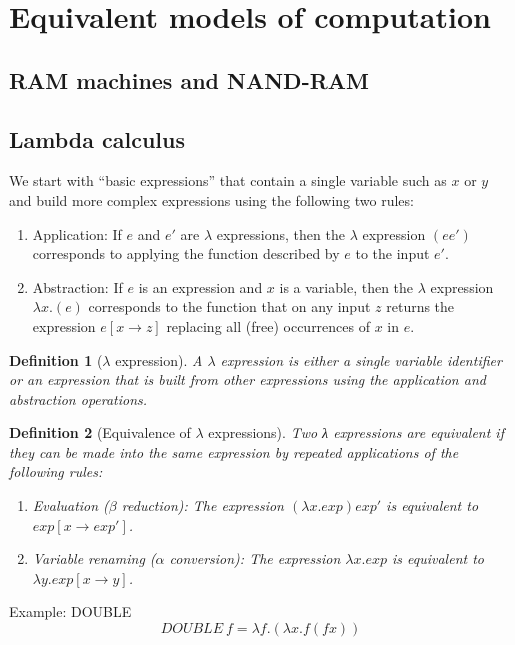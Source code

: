 \documentclass[aps,pra,onecolumn,notitlepage,superscriptaddress]{revtex4-1}
\newtheorem{defi}{Definition}
\begin{document}
    \section{Equivalent models of computation}
    \subsection{RAM machines and NAND-RAM}
    \subsection{Lambda calculus}
    We start with ``basic expressions'' that contain a single variable such as $x$ or $y$ and build more complex expressions using the following two rules:
    \begin{enumerate}
        \item Application: If $e$ and $e'$ are $\lambda$ expressions, then the $\lambda$ expression $(ee')$ corresponds to applying the function described by $e$ to the input $e'$.
        \item Abstraction: If $e$ is an expression and $x$ is a variable, then the $\lambda$ expression $\lambda x . (e)$ corresponds to the function that on any input $z$ returns the expression $e[x \to z]$ replacing all (free) occurrences of $x$
        in $e$.
    \end{enumerate}

    \begin{defi}[$\lambda$ expression]
        A $\lambda$ expression is either a single variable identifier or an expression that is built from other expressions using the application and abstraction operations.  
    \end{defi}

    \begin{defi}
        [Equivalence of $\lambda$ expressions] Two λ expressions are equivalent if they can be made into the same expression by repeated applications of the following rules:
        \begin{enumerate}
            \item Evaluation ($\beta$ reduction): The expression $(\lambda x.exp)exp'$ is equivalent to $exp[x \to exp']$.
            \item Variable renaming ($\alpha$ conversion): The expression $\lambda x.exp$ is equivalent to $\lambda y.exp[x \to y]$.
        \end{enumerate}
    \end{defi}

    Example: DOUBLE
    \begin{equation}
        DOUBLE \ f = \lambda f.(\lambda x.f(fx))
    \end{equation}
\end{document}
